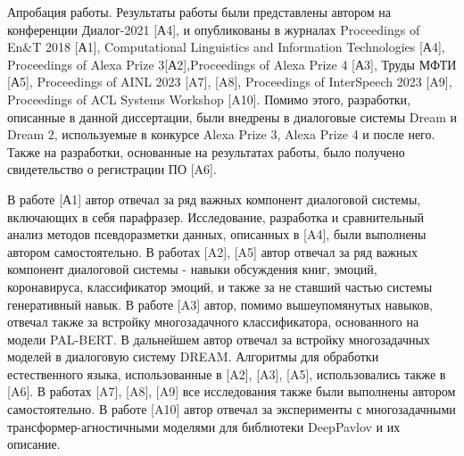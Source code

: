 {\probation}
Апробация работы. Результаты работы были представлены автором на конференции Диалог-2021 [А4], и опубликованы в журналах Proceedings of En\&T 2018 [А1], Computational Linguistics and Information Technologies [А4], Proceedings of Alexa Prize 3[А2],Proceedings of Alexa Prize 4 [А3], Труды МФТИ [А5], Proceedings of AINL 2023 [A7], [A8], Proceedings of InterSpeech 2023 [A9], Proceedings of ACL Systems Workshop [A10]. Помимо этого, разработки, описанные в данной диссертации, были внедрены в диалоговые системы Dream и Dream 2, используемые в конкурсе Alexa Prize 3, Alexa Prize 4 и после него. Также на разработки, основанные на результатах работы, было получено свидетельство о регистрации ПО [A6].


{\contribution} В работе [А1] автор отвечал за ряд важных компонент диалоговой системы, включающих в себя парафразер. Исследование, разработка и сравнительный анализ методов псевдоразметки данных, описанных в [A4], были выполнены автором самостоятельно. В работах [A2],  [A5] автор отвечал за ряд важных компонент диалоговой системы - навыки обсуждения книг, эмоций, коронавируса, классификатор эмоций, и также за не ставший частью системы генеративный навык. В работе [A3] автор, помимо вышеупомянутых навыков, отвечал также за встройку многозадачного классификатора, основанного на модели PAL-BERT. В дальнейшем автор отвечал за встройку многозадачных моделей в диалоговую систему DREAM. Алгоритмы для обработки естественного языка, использованные в [A2], [A3], [A5], использовались также в [A6]. В работах [A7], [A8], [A9] все исследования также были выполнены автором самостоятельно. В работе [A10] автор отвечал за эксперименты с многозадачными трансформер-агностичными моделями для библиотеки DeepPavlov и их описание.

